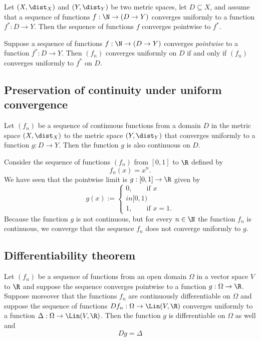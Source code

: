 \begin{proposition}
    Let $(X,\dist_X)$ and $(Y,\dist_Y)$ be two metric spaces, let $D \subseteq X$, and assume
    that a sequence of functions $f:\N \to (D \to Y)$ converges uniformly to a function $f^*:D \to Y$.
    Then the sequence of functions $f$ converges pointwise to $f^*$.
\end{proposition}

\begin{corollary}
    Suppose a sequence of functions $f:\N \to (D \to Y)$ converges \emph{pointwise} to a function $f^*:D \to Y$.
    Then $(f_n)$ converges uniformly on $D$ if and only if $(f_n)$ converges uniformly to $f^*$ on $D$.
\end{corollary}

\subsection{Preservation of continuity under uniform convergence}
\begin{theorem}
    Let $(f_n)$ be a sequence of continuous functions from a domain $D$ in the metric space $(X,\dist_X)$ to the metric space $(Y,\dist_Y)$
    that converges uniformly to a function $g:D \to Y$. Then the function $g$ is also continuous on $D$.
\end{theorem}
\begin{example}
    Consider the sequence of functions $(f_n)$ from $[0,1]$ to $\R$ defined by
    $$f_n(x) = x^n.$$
    We have seen that the pointwise limit is $g:[0,1] \to \R$ given by
    $$g(x) := \begin{cases}0, \qquad\text{if } x \\in [0,1) \\1, \qquad\text{if }x=1.\end{cases}$$
    Because the function $g$ is not continuous, but for every $n \in \N$ the function $f_n$ is continuous,
    we converge that the sequence $f_n$ does not converge uniformly to $g$.
\end{example}

\subsection{Differentiability theorem}
\begin{theorem}
    Let $(f_n)$ be a sequence of functions from an open domain $\Omega$ in a vector space $V$ to $\R$ and suppose the sequence converges
    pointwise to a function $g:\Omega \to \R$. Suppose moreover that the functions $f_n$ are continuously differentiable on $\Omega$
    and suppose the sequence of functions $Df_n:\Omega \to \Lin(V,\R)$ converges uniformly to a function $\Delta:\Omega \to \Lin(V,\R)$.
    Then the function $g$ is differentiable on $\Omega$ as well and
    $$Dg = \Delta$$
\end{theorem}

